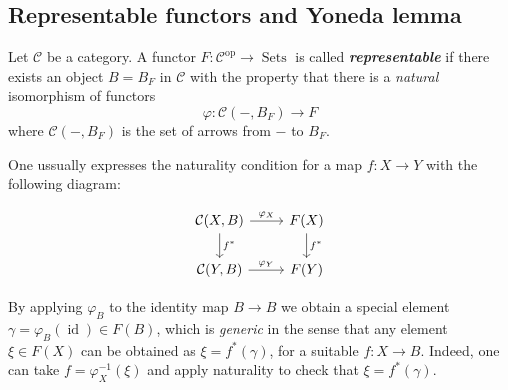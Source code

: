 \subsection{Representable functors and Yoneda lemma}

\begin{defn}
	Let $\mathcal{C}$ be a category. A functor $F:\mathcal{C}^{\operatorname{op}}\to \operatorname{Sets}$ is called \textit{\textbf{representable}} if there exists an object $B=B_{F}$ in $\mathcal{C}$ with the property that there is a \textit{natural} isomorphism of functors
	\[\varphi:\mathcal{C}(-,B_{F})\to F\]
	where $\mathcal{C}(-,B_{F})$ is the set of arrows from $-$ to $B_{F}$.

	One ussually expresses the naturality condition for a map $f:X\to Y$ with the following diagram:

	\[\begin{tikzcd}
		\mathcal{C}(X,B)\arrow[r,"\varphi_{X}"]\arrow[d,"f^{*}"]&F(X)\arrow[d,"f^{*}"]\\
		\mathcal{C}(Y,B)\arrow[r,"\varphi_{Y}"]&F(Y)
	\end{tikzcd}\]
\end{defn}

\begin{remark}
	By applying $\varphi_{B}$ to the identity map  $B\to B$ we obtain a special element $\gamma=\varphi_{B}(\operatorname{id})\in F(B)$, which is \textit{generic} in the sense that any element $\xi \in F(X)$ can be obtained as $\xi=f^{*} (\gamma)$, for a suitable $f:X\to B$. Indeed, one can take $f=\varphi^{-1}_{X}(\xi)$ and apply naturality to check that $\xi=f^{*}(\gamma)$. 
\end{remark}


